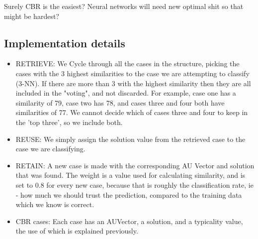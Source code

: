 \documentclass[12pt]{article}
\begin{document}
Surely CBR is the easiest? Neural networks will need new optimal shit so that might be hardest?

\subsection*{Implementation details}
\begin{itemize}
  \item RETRIEVE:
    We Cycle through all the cases in the structure, picking the cases with the 3 highest similarities to the case we are attempting to classify (3-NN). If there are more than 3 with the highest similarity then they are all included in the "voting", and not discarded. For example, case one has a similarity of 79, case two has 78, and cases three and four both have similarities of 77. We cannot decide which of cases three and four to keep in the 'top three', so we include both.
  \item REUSE:
    We simply assign the solution value from the retrieved case to the case we are classifying.
  \item RETAIN:
    A new case is made with the corresponding AU Vector and solution that was found. The weight is a value used for calculating similarity, and is set to 0.8 for every new case, because that is roughly the classification rate, ie - how much we should trust the prediction, compared to the training data which we know is correct.
  \item CBR cases:
    Each case has an AUVector, a solution, and a typicality value, the use of which is explained previously.
\end{itemize}
\end{document}
